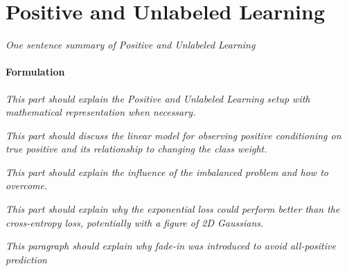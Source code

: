 \section{Positive and Unlabeled Learning}
\label{sec:pulearning}

\textit{One sentence summary of Positive and Unlabeled Learning}


\paragraph{Formulation}

\textit{This part should explain the Positive and Unlabeled Learning setup with mathematical representation when necessary.}


\textit{This part should discuss the linear model for observing positive conditioning on true positive and its relationship to changing the class weight.}


\textit{This part should explain the influence of the imbalanced problem and how to overcome.}


\textit{This part should explain why the exponential loss could perform better than the cross-entropy loss, potentially with a figure of 2D Gaussians.}


\textit{This paragraph should explain why fade-in was introduced to avoid all-positive prediction}




